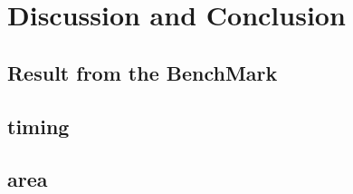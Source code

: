 %
\chapter{Discussion and Conclusion}
\label{Discussion and Conclusion}



\section{Result from the BenchMark}

	
\section{timing}



\section{area}